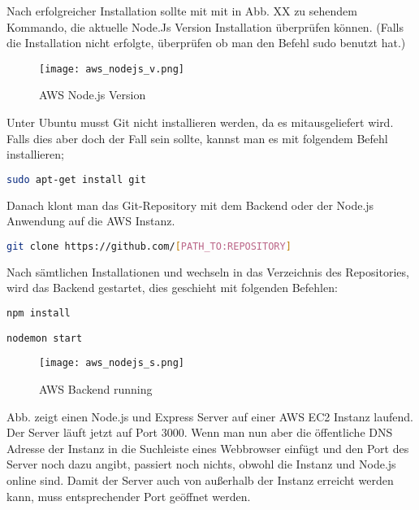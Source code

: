 Nach erfolgreicher Installation sollte mit mit in Abb. XX zu sehendem Kommando, die aktuelle Node.Js Version Installation überprüfen können. (Falls die Installation nicht erfolgte, überprüfen ob man den Befehl sudo benutzt hat.)

\begin{center}
\begin{figure}[h]
    \centering
    \texttt{[image: aws\_nodejs\_v.png]}
    \caption{AWS Node.js Version}
\end{figure}
\end{center}

Unter Ubuntu musst Git nicht installieren werden, da es mitausgeliefert wird. Falls dies aber doch der Fall sein sollte, kannst man es mit folgendem Befehl installieren;

\begin{lstlisting}[language=bash]
sudo apt-get install git
\end{lstlisting}

Danach klont man das Git-Repository mit dem Backend oder der Node.js Anwendung auf die AWS Instanz.


\begin{lstlisting}[language=bash]
git clone https://github.com/[PATH_TO:REPOSITORY]
\end{lstlisting}

Nach sämtlichen Installationen und wechseln in das Verzeichnis des Repositories, wird das Backend gestartet, dies geschieht mit folgenden Befehlen:

\begin{lstlisting}[language=bash]
npm install

nodemon start
\end{lstlisting}

\begin{center}
\begin{figure}[h]
    \centering
    \texttt{[image: aws\_nodejs\_s.png]}
    \caption{AWS Backend running}
\end{figure}
\end{center}

Abb. zeigt einen Node.js und Express Server auf einer AWS EC2 Instanz laufend. Der Server läuft jetzt auf Port 3000. Wenn man nun aber die öffentliche DNS Adresse der Instanz in die Suchleiste eines Webbrowser einfügt und den Port des Server noch dazu angibt, passiert noch nichts, obwohl die Instanz und Node.js online sind. Damit der Server auch von außerhalb der Instanz erreicht werden kann, muss entsprechender Port geöffnet werden.


